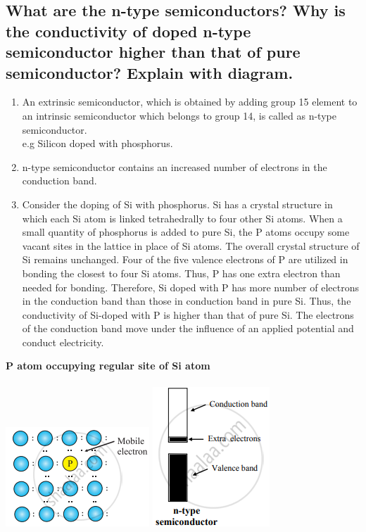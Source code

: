 \documentclass{article}
\begin{document}
   \subsection{What are the n-type semiconductors? Why is the
   conductivity of doped n-type semiconductor higher than that of pure
   semiconductor? Explain with diagram.}

   \begin{enumerate}
   \item An extrinsic semiconductor, which is obtained by adding group
   15 element to an intrinsic semiconductor which belongs to group 14,
   is called as n-type semiconductor.\\
   e.g Silicon doped with phosphorus.
   \item n-type semiconductor contains an increased number of electrons
   in the conduction band.
   \item Consider the doping of Si with phosphorus. Si has a crystal
   structure in which each Si atom is linked tetrahedrally to four
   other Si atoms. When a small quantity of phosphorus is added to
   pure Si, the P atoms occupy some vacant sites in the lattice in
   place of Si atoms. The overall crystal structure of Si remains
   unchanged. Four of the five valence electrons of P are utilized in
   bonding the closest to four Si atoms. Thus, P has one extra
   electron than needed for bonding. Therefore, Si doped with P has
   more number of electrons in the conduction band than those in
   conduction band in pure Si. Thus, the conductivity of Si-doped with
   P is higher than that of pure Si. The electrons of the conduction
   band move under the influence of an applied potential and conduct
   electricity.\\
   \end{enumerate}
   \textbf{P atom occupying regular site of Si atom}\\\\
   \includegraphics[scale=0.3]{mobile}
   \includegraphics[scale=1.3]{ntype}
\end{document}
